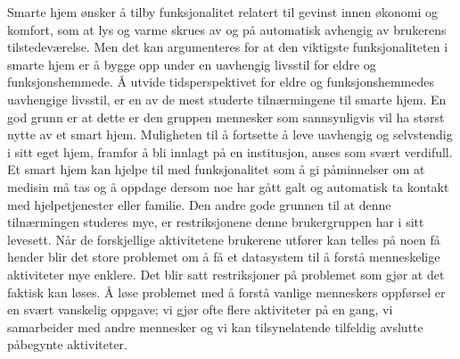 Smarte hjem ønsker å tilby funksjonalitet relatert til gevinst innen økonomi og komfort, som at lys og varme skrues av og på automatisk avhengig av brukerens tilstedeværelse. Men det kan argumenteres for at den viktigste funksjonaliteten i smarte hjem er å bygge opp under en uavhengig livsstil for eldre og funksjonshemmede. Å utvide tidsperspektivet for eldre og funksjonshemmedes uavhengige livsstil, er en av de mest studerte tilnærmingene til smarte hjem. En god grunn er at dette er den gruppen mennesker som sannsynligvis vil ha størst nytte av et smart hjem. Muligheten til å fortsette å leve uavhengig og selvstendig i sitt eget hjem, framfor å bli innlagt på en institusjon, anses som svært verdifull. Et smart hjem kan hjelpe til med funksjonalitet som å gi påminnelser om at medisin må tas og å oppdage dersom noe har gått galt og automatisk ta kontakt med hjelpetjenester eller familie. Den andre gode grunnen til at denne tilnærmingen studeres mye, er restriksjonene denne brukergruppen har i sitt levesett. Når de forskjellige aktivitetene brukerene utfører kan telles på noen få hender blir det store problemet om å få et datasystem til å forstå menneskelige aktiviteter mye enklere. Det blir satt restriksjoner på problemet som gjør at det faktisk kan løses. Å løse problemet med å forstå vanlige menneskers oppførsel er en svært vanskelig oppgave; vi gjør ofte flere aktiviteter på en gang, vi samarbeider med andre mennesker og vi kan tilsynelatende tilfeldig avslutte påbegynte aktiviteter.

